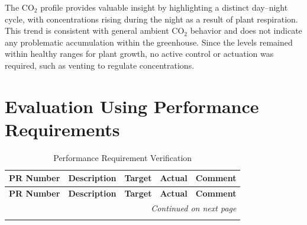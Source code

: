 The \(\mathrm{CO_{2}}\) profile provides valuable insight by highlighting a distinct day–night cycle, with concentrations rising during the night as a result of plant respiration. 
This trend is consistent with general ambient \(\mathrm{CO_{2}}\) behavior and does not indicate any problematic accumulation within the greenhouse. Since the levels remained within healthy ranges for plant growth, no active control or actuation was required, such as venting to regulate concentrations.  


\section{Evaluation Using Performance Requirements}

\begin{ThreePartTable}
	\small
	\begin{TableNotes}
		\footnotesize
	\end{TableNotes}
	
	\begin{longtable}{|p{1.5cm}|p{4.4cm}|c|p{3cm}|p{3cm}|}
		\caption{Performance Requirement Verification}\label{tab:performance_verification}\\
		\hline
		\textbf{PR Number} & \textbf{Description} & \textbf{Target} & \textbf{Actual} & \textbf{Comment} \\
		\hline
		\endfirsthead
		
		\hline
		\textbf{PR Number} & \textbf{Description} & \textbf{Target} & \textbf{Actual} & \textbf{Comment} \\
		\hline
		\endhead
		
		\hline
		\multicolumn{5}{r}{\emph{Continued on next page}}\\
		\endfoot
		
		\hline
		\endlastfoot
		

\end{longtable}
\end{ThreePartTable}
